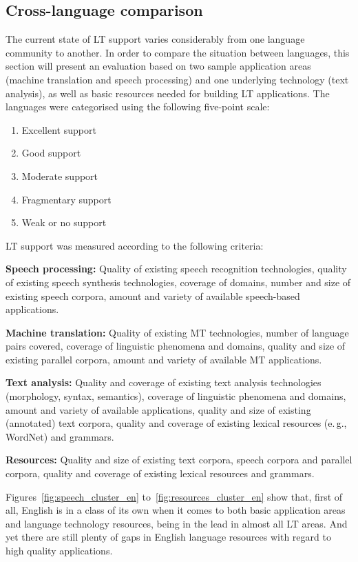 \begin{multicols}{2}
\subsection{Cross-language comparison}

The current state of LT support varies considerably from one language community to another. In order to compare the situation between languages, this section will present an evaluation based on two sample application areas (machine translation and speech processing) and one underlying technology (text analysis), as well as basic resources needed for building LT applications. The languages were categorised using the following five-point scale: 

\begin{enumerate}[itemsep=0pt,parsep=0pt]
\item Excellent support
\item Good support
\item Moderate support
\item Fragmentary support
\item Weak or no support
\end{enumerate}

LT support was measured according to the following criteria:

\textbf{Speech processing:} Quality of existing speech recognition technologies, quality of existing speech synthesis technologies, coverage of domains, number and size of existing speech corpora, amount and variety of available speech-based applications.

\textbf{Machine translation:} Quality of existing MT technologies, number of language pairs covered, coverage of linguistic phenomena and domains, quality and size of existing parallel corpora, amount and variety of available MT applications.

\textbf{Text analysis:} Quality and coverage of existing text analysis technologies (morphology, syntax, semantics), coverage of linguistic phenomena and domains, amount and variety of available applications, quality and size of existing (annotated) text corpora, quality and coverage of existing lexical resources (e.\,g., WordNet) and grammars.

\textbf{Resources:} Quality and size of existing text corpora, speech corpora and parallel corpora, quality and coverage of existing lexical resources and grammars.

Figures~\ref{fig:speech_cluster_en} to~\ref{fig:resources_cluster_en}
show that, first of all, English is in a class of its own when it
comes to both basic application areas and language technology
resources, being in the lead in almost all LT areas. And yet there are
still plenty of gaps in English language resources with regard to high
quality applications.


\end{multicols}
